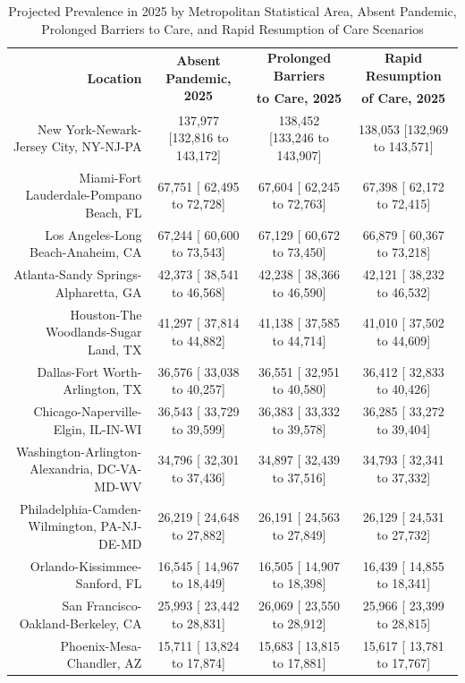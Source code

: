 \documentclass{article}
\begin{document}
\begin{table}[H]
	\caption{Projected Prevalence in 2025 by Metropolitan Statistical Area, Absent Pandemic, Prolonged Barriers to Care, and Rapid Resumption of Care Scenarios}
	\footnotesize
	\begin{tabular}{|r|c|c|c|}
		\hline
		\multirow{2}{*}{\textbf{Location}} & \multirow{2}{*}{\textbf{Absent Pandemic, 2025}} & \textbf{Prolonged Barriers} & \textbf{Rapid Resumption}\\
		&  & \textbf{to Care, 2025} & \textbf{of Care, 2025}\\
		\hline\hline
		New York-Newark-Jersey City, NY-NJ-PA & 137,977 [132,816 to 143,172] & 138,452 [133,246 to 143,907] & 138,053 [132,969 to 143,571]\\
		Miami-Fort Lauderdale-Pompano Beach, FL &  67,751 [ 62,495 to  72,728] &  67,604 [ 62,245 to  72,763] &  67,398 [ 62,172 to  72,415]\\
		Los Angeles-Long Beach-Anaheim, CA &  67,244 [ 60,600 to  73,543] &  67,129 [ 60,672 to  73,450] &  66,879 [ 60,367 to  73,218]\\
		Atlanta-Sandy Springs-Alpharetta, GA &  42,373 [ 38,541 to  46,568] &  42,238 [ 38,366 to  46,590] &  42,121 [ 38,232 to  46,532]\\
		Houston-The Woodlands-Sugar Land, TX &  41,297 [ 37,814 to  44,882] &  41,138 [ 37,585 to  44,714] &  41,010 [ 37,502 to  44,609]\\
		Dallas-Fort Worth-Arlington, TX &  36,576 [ 33,038 to  40,257] &  36,551 [ 32,951 to  40,580] &  36,412 [ 32,833 to  40,426]\\
		Chicago-Naperville-Elgin, IL-IN-WI &  36,543 [ 33,729 to  39,599] &  36,383 [ 33,332 to  39,578] &  36,285 [ 33,272 to  39,404]\\
		Washington-Arlington-Alexandria, DC-VA-MD-WV &  34,796 [ 32,301 to  37,436] &  34,897 [ 32,439 to  37,516] &  34,793 [ 32,341 to  37,332]\\
		Philadelphia-Camden-Wilmington, PA-NJ-DE-MD &  26,219 [ 24,648 to  27,882] &  26,191 [ 24,563 to  27,849] &  26,129 [ 24,531 to  27,732]\\
		Orlando-Kissimmee-Sanford, FL &  16,545 [ 14,967 to  18,449] &  16,505 [ 14,907 to  18,398] &  16,439 [ 14,855 to  18,341]\\
		San Francisco-Oakland-Berkeley, CA &  25,993 [ 23,442 to  28,831] &  26,069 [ 23,550 to  28,912] &  25,966 [ 23,399 to  28,815]\\
		Phoenix-Mesa-Chandler, AZ &  15,711 [ 13,824 to  17,874] &  15,683 [ 13,815 to  17,881] &  15,617 [ 13,781 to  17,767]\\

\end{tabular}
\end{table}
\end{document}
